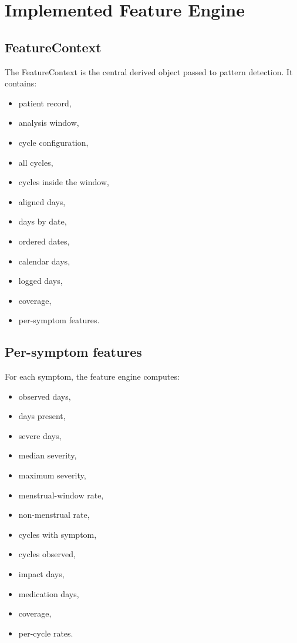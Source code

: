 \documentclass[11pt,a4paper]{article}
\begin{document}
\section{Implemented Feature Engine}

\subsection{FeatureContext}

The FeatureContext is the central derived object passed to pattern detection. It contains:

\begin{itemize}
  \item patient record,
  \item analysis window,
  \item cycle configuration,
  \item all cycles,
  \item cycles inside the window,
  \item aligned days,
  \item days by date,
  \item ordered dates,
  \item calendar days,
  \item logged days,
  \item coverage,
  \item per-symptom features.
\end{itemize}

\subsection{Per-symptom features}

For each symptom, the feature engine computes:

\begin{itemize}
  \item observed days,
  \item days present,
  \item severe days,
  \item median severity,
  \item maximum severity,
  \item menstrual-window rate,
  \item non-menstrual rate,
  \item cycles with symptom,
  \item cycles observed,
  \item impact days,
  \item medication days,
  \item coverage,
  \item per-cycle rates.
\end{itemize}
\end{document}
